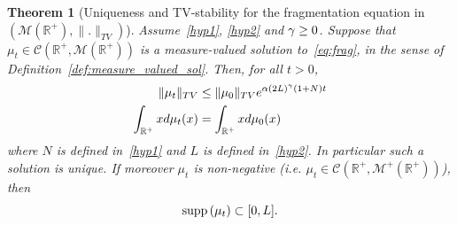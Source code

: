 \documentclass[10pt,a4paper]{amsart}
\numberwithin{equation}{section}
\newcommand*\dst{\displaystyle}
\newcommand*\R{\mathbb{R}}
\newcommand*\M{\mathcal{M}}
\newcommand{\clC}{\mathcal{C}}
\newcommand{\comMD}[1]{\textcolor{black}{#1}}
\newcommand{\MT}[1]{{\textcolor{black}{#1}}}
\newcommand*\supp{{\mbox{\small\rm supp}}\,}
\newtheorem{theo}[defi]{Theorem}
\begin{document}
\begin{theo}[Uniqueness and TV-stability for the fragmentation equation in $(\M(\R^+),\|.\|_{TV})$]\label{thm:WP_BV}
Assume~\eqref{hyp1}, \eqref{hyp2} and $\comMD{\gamma\geq 0}$. Suppose that $\mu _t\in \clC(\R^+, \M(\R^+))$ is a measure-valued solution to~\eqref{eq:frag}, in the sense of Definition~\ref{def:measure_valued_sol}.
Then, for all $t>0$,
\begin{align}
\|\mu_t\|_{TV} &\leq \|\mu_0\|_{TV} e^{\alpha (2\MT{L})^{\gamma} (1+N) t} \label{pgcd2}
\\
\dst\int_{\R^+} xd\mu_t(x) &=\dst\int_{\R^+} xd\mu_0(x) \label{pgcd3}
\end{align}
where $N$ is defined in~\eqref{hyp1} and $L$ is defined in~\eqref{hyp2}. In particular such a solution is unique.
If moreover $\mu_t$ is non-negative (i.e. $\mu_t \in \clC(\R^+,\M^+(\R^+))$), then
\begin{equation}\label{pgcd11}
\supp(\mu_t) \subset [0,\MT{L}]. 
\end{equation}
\end{theo}
\end{document}
